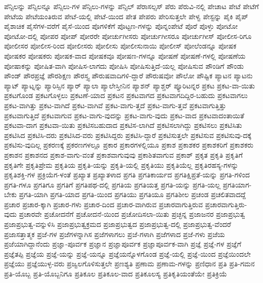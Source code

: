 {ಪೆನ್ಸಿಲನ್ನು
ಪೆನ್ಸಿಲನ್ನೂ
ಪೆನ್ಸಿಲು-ಗಳ
ಪೆನ್ಸಿಲು-ಗಳನ್ನು
ಪೆನ್ಸಿಲ್
ಪೆರಾಸಲ್ಸಸ್
ಪೆರು
ಪೆರುವಿ-ನಲ್ಲಿ
ಪೇಚಾಟ
ಪೇಟೆ
ಪೇಟೆಗೆ
ಪೇಟೆಯ
ಪೇಟೆಯಂತಿರುವ
ಪೇಟೆ-ಯಲ್ಲಿ
ಪೇಟೆ-ಯಿಂದ
ಪೇತ
ಪೇಪರು
ಪೇರಿಸುತ್ತಲೇ
ಪೇಳ್ವ
ಪೇಸ್ಟನ್ನು
ಪೈಕಿ
ಪೈಪ್
ಪೈಶಾಚಿಕ
ಪೈಸೆಗಳ-ವರೆಗೆ
ಪೈಸೆ-ಯಿಂದ
ಪೊಗಳಿಕೆಗೆ
ಪೊಟ್ಟಣ-ಗಳನ್ನು
ಪೊನ್ನಂಪೇಟೆ
ಪೊರೆ
ಪೊಳ್ಳು
ಪೋಟೋ
ಪೋಟೋ-ದಲ್ಲಿ
ಪೋಪರ
ಪೋಪ್
ಪೋರರೇ
ಪೋರ್ಚುಗೀಸರು
ಪೋರ್ಚುಗೀಸರೂ
ಪೋರ್ಚುಗೀಸ್
ಪೋಲೀಸ-ರಿಗೂ
ಪೋಲೀಸರ
ಪೋಲೀಸ-ರಿಂದ
ಪೋಲೀಸರು
ಪೋಲೀಸು
ಪೋಲೀಸುನಾಯಿ
ಪೋಲೀಸ್
ಪೋಲೆಂಡನ್ನೂ
ಪೋಷಕ
ಪೋಷಕರ
ಪೋಷಕರು
ಪೋಷಕ-ವಾದ
ಪೋಷಕವೂ
ಪೋಷಣ-ಗಳನ್ನೂ
ಪೋಷಣೆ
ಪೋಷಣೆ-ಗಳಲ್ಲಿ
ಪೋಷಣೆಯ
ಪೋಷಾಕನ್ನು
ಪೋಷಿತ-ವಾಗಿ
ಪೋಷಿಸ-ಲಾಗದು
ಪೋಷಿಸಿ
ಪೋಷಿಸುತ್ತಿದೆ-ಯಲ್ಲ
ಪೋಷಿಸುವ
ಪೌಂಡಿಗೆ
ಪೌಂಡು
ಪೌಂಡ್
ಪೌರಪ್ರಜ್ಞೆ
ಪೌರಶಿಕ್ಷಣ
ಪೌರಸ್ತ್ಯ
ಪೌರುಷವಾದಿಗಳಿ-ದ್ದಾರೆ
ಪೌರುಷವೋ
ಪೌಲೋ
ಪೌಷ್ಟಿಕ
ಪ್ಯಾಟನ
ಪ್ಯಾಟನು
ಪ್ಯಾಟ್
ಪ್ಯಾಟ್ನನ್ನು
ಪ್ಯಾರಿಸ್ಸಿನ
ಪ್ಯಾರ್
ಪ್ಯಾಲಾ
ಪ್ಯಾಲೇಸ್ತೀನಿನ
ಪ್ಯಾಶನ್
ಪ್ಯಾಶ್ಚರ್
ಪ್ಯೂರಿಟನ್ನರ
ಪ್ರಕಟ
ಪ್ರಕಟ-ವಾ-ಯಿತು
ಪ್ರಕಟಗೊಂಡ
ಪ್ರಕಟಗೊಳ್ಳಲು
ಪ್ರಕಟಣೆ-ಯಾದ
ಪ್ರಕಟನ
ಪ್ರಕಟವಾಗದ
ಪ್ರಕಟವಾಗದಿದ್ದಿರ-ಬಹುದು
ಪ್ರಕಟವಾಗಲು
ಪ್ರಕಟ-ವಾಗಿತ್ತು
ಪ್ರಕಟ-ವಾಗಿದೆ
ಪ್ರಕಟ-ವಾಗಿವೆ
ಪ್ರಕಟ-ವಾಗು-ತ್ತದೆ
ಪ್ರಕಟ-ವಾಗು-ತ್ತವೆ
ಪ್ರಕಟವಾಗುತ್ತಿತ್ತು
ಪ್ರಕಟವಾಗುತ್ತಿದೆ
ಪ್ರಕಟವಾಗುವ
ಪ್ರಕಟ-ವಾಗು-ವುದನ್ನು
ಪ್ರಕಟ-ವಾಗು-ವುದು
ಪ್ರಕಟ-ವಾದ
ಪ್ರಕಟವಾದಂತಾಯಿತೆ
ಪ್ರಕಟವಾ-ದಾಗ
ಪ್ರಕಟವಾ-ಯಿತು
ಪ್ರಕಟಿಸಬಹುದಾದ
ಪ್ರಕಟಿಸ-ಲಾಗಿದೆ
ಪ್ರಕಟಿಸಲಾಗಿದ್ದು
ಪ್ರಕಟಿಸಲು
ಪ್ರಕಟಿಸಿತು
ಪ್ರಕಟಿಸಿದ
ಪ್ರಕಟಿಸಿ-ದರು
ಪ್ರಕಟಿಸಿದ-ವರು
ಪ್ರಕಟಿಸಿದ್ದರು
ಪ್ರಕಟಿಸಿ-ದ್ದಾರೆ
ಪ್ರಕಟಿಸುತ್ತಲೇ
ಪ್ರಕಟಿಸುವ
ಪ್ರಕಟಿಸುವು-ದಕ್ಕೆ
ಪ್ರಕಟಿಸು-ವುದಿಲ್ಲ
ಪ್ರಕರಣಕ್ಕೆ
ಪ್ರಕರಣಗಳಲ್ಲೂ
ಪ್ರಕಾರ
ಪ್ರಕಾರಗಳಲ್ಲಿಯೂ
ಪ್ರಕಾಶ
ಪ್ರಕಾಶಕರ
ಪ್ರಕಾಶಕರಿಗೆ
ಪ್ರಕಾಶಕರು
ಪ್ರಕಾಶನ
ಪ್ರಕಾಶನದ
ಪ್ರಕಾಶ-ವಾಗು-ವಂತೆ
ಪ್ರಕಾಶವಾಗುವುವು
ಪ್ರಕಾಶಿತವಾಗುವ
ಪ್ರಕಾಶ್
ಪ್ರಕೃತ
ಪ್ರಕೃತಿ
ಪ್ರಕೃತಿಗೆ
ಪ್ರಕೃತಿಗೇ
ಪ್ರಕೃತಿಪ್ರೇಮ
ಪ್ರಕೃತಿಯ
ಪ್ರಕೃತಿ-ಯನ್ನು
ಪ್ರಕೃತಿ-ಯಲ್ಲಿ
ಪ್ರಕೃತಿಯು
ಪ್ರಕೃತಿಯೆಲ್ಲ
ಪ್ರಕೃತಿರಹಸ್ಯ-ಗಳನ್ನು
ಪ್ರಕೃತಿಶಕ್ತಿ-ಗಳ
ಪ್ರಕ್ರಿಯೆಗ-ಳಂತೆ
ಪ್ರಖ್ಯಾತ
ಪ್ರಖ್ಯಾತಳಾದ
ಪ್ರಗತಿ
ಪ್ರಗತಿಕಾರ್ಯದ
ಪ್ರಗತಿಕ್ಷಿಪ್ರತೆ-ಯನ್ನು
ಪ್ರಗತಿ-ಗಳಿಂದ
ಪ್ರಗತಿ-ಗಳೂ
ಪ್ರಗತಿಗೂ
ಪ್ರಗತಿಗೆ
ಪ್ರಗತಿಪಥ-ದಲ್ಲಿ
ಪ್ರಗತಿಯ
ಪ್ರಗತಿಯತ್ತ
ಪ್ರಗತಿ-ಯನ್ನು
ಪ್ರಗತಿ-ಯಲ್ಲ
ಪ್ರಗತಿಯಾಗ-ಬೇಕು
ಪ್ರಗತಿ-ಯಾಗಿ
ಪ್ರಗತಿ-ಯಾದ
ಪ್ರಗತಿ-ಯಿಂದ
ಪ್ರಗತಿಯು
ಪ್ರಗತಿಯೂ
ಪ್ರಗತಿಶೀಲ
ಪ್ರಚಂಡ
ಪ್ರಚಲಿತವಾದದ್ದೆ
ಪ್ರಚಾರ
ಪ್ರಚಾರ-ಕ್ಕಾಗಿ
ಪ್ರಚಾರ-ಗಳು
ಪ್ರಚಾರ-ದಿಂದ
ಪ್ರಚಾರ-ವಾಗಿರುವ
ಪ್ರಚಾರವಾಗುತ್ತಿರುವ
ಪ್ರಚಾರವಾಗುತ್ತಿರು-ವುದು
ಪ್ರಚಾರವೇ
ಪ್ರಚೋದನೆಗೆ
ಪ್ರಚೋದನೆ-ಯಿಂದ
ಪ್ರಚೋದಿಸಲಾ-ಯಿತು
ಪ್ರಚ್ಛನ್ನ
ಪ್ರಜಾಜನರ
ಪ್ರಜಾಪ್ರಭುತ್ವ
ಪ್ರಜಾಪ್ರಭುತ್ವ-ವನ್ನುಳಿಸಿ
ಪ್ರಜಾಪ್ರಭುತ್ವಕ್ರಮದ
ಪ್ರಜಾಪ್ರಭುತ್ವದ
ಪ್ರಜಾಪ್ರಭುತ್ವ-ದಲ್ಲಿ
ಪ್ರಜಾಪ್ರಭುತ್ವ-ವೆಂದರೆ
ಪ್ರಜಾಸತ್ತಾತ್ಮಕ
ಪ್ರಜೆ-ಗಳ
ಪ್ರಜೆಗಳನ್ನಾಗಿಸ
ಪ್ರಜೆಗಳಾಗಲು
ಪ್ರಜೆ-ಗಳಾಗಿ
ಪ್ರಜೆಗಳಾದ
ಪ್ರಜೆ-ಗಳು
ಪ್ರಜೆಯ
ಪ್ರಜೆಯಾಗಿದ್ದಾನೆಂದು
ಪ್ರಜ್ಞಾ-ಪೂರ್ವಕ
ಪ್ರಜ್ಞಾನ
ಪ್ರಜ್ಞಾಪೂರ್ವಕ
ಪ್ರಜ್ಞಾಪೂರ್ವಕ-ವಾಗಿ
ಪ್ರಜ್ಞೆ
ಪ್ರಜ್ಞೆ-ಗಳ
ಪ್ರಜ್ಞೆಗೆ
ಪ್ರಜ್ಞೆತಪ್ಪಿ
ಪ್ರಜ್ಞೆಯ
ಪ್ರಜ್ಞೆ-ಯನ್ನು
ಪ್ರಜ್ಞೆ-ಯನ್ನೂ
ಪ್ರಜ್ಞೆಯನ್ನೊಳಗೊಂಡ
ಪ್ರಜ್ಞೆ-ಯಲ್ಲಿ
ಪ್ರಜ್ಞೆ-ಯಿಂದ
ಪ್ರಜ್ಞೆಯಿಂದಲೇ
ಪ್ರಜ್ಞೆಯು
ಪ್ರಜ್ಞೆಯುಳ್ಳ-ವರು
ಪ್ರಜ್ವಲಗೊಳಿಸುತ್ತಲೇ
ಪ್ರಣಶ್ಯತಿ
ಪ್ರಣಾಮ
ಪ್ರಣಾಮ-ಗಳನ್ನು
ಪ್ರಣಿಧಾನ
ಪ್ರತಿ
ಪ್ರತಿ-ಗಮನ
ಪ್ರತಿ-ಯೊಬ್ಬ
ಪ್ರತಿ-ಯೊಬ್ಬನಿಗೂ
ಪ್ರತಿಕೂಲ
ಪ್ರತಿಕೂಲ-ವಾದ
ಪ್ರತಿಕೂಲಸ್ಯ
ಪ್ರತಿಕೃತಿಯಂತೆಯೇ
ಪ್ರತಿಕ್ರಿಯೆ
}
